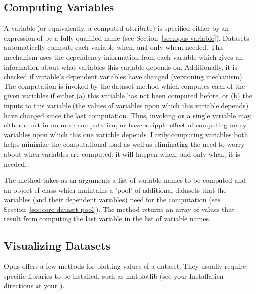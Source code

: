 %
\subsection{Computing Variables}
%
A variable (or equivalently, a computed attribute) is specified either by an expression of by a 
fully-qualified name (see Section~\ref{sec:opus-variable}).
Datasets \datasetindex automatically compute each variable \variablesindex when, and only when,
needed.   This mechanism uses the dependency information
from each variable \variablesindex which gives an information about what variables \variablesindex this
variable \variablesindex depends on. Additionally, it is checked if variable's \variablesindex dependent
variables \variablesindex have changed (versioning mechanism).  The computation is invoked by
the dataset \datasetindex method  which computes each of the
given variables \variablesindex if either (a) this variable \variablesindex has not been computed before, or
(b) the inputs to this variable \variablesindex (the values of variables \variablesindex upon which this
variable \variablesindex depends) have changed since the last computation.  Thus, invoking
 \variablesindex on a single variable \variablesindex may either result in no more
computation, or have a ripple effect of computing many variables \variablesindex upon which
this one variable \variablesindex depends.  Lazily computing variables \variablesindex both helps minimize the
computational load as well as eliminating the need to worry about when
variables \variablesindex are computed: it will happen when, and only when, it is needed.

The method  \variablesindex takes as an arguments a list of
variable \variablesindex names to be computed and an object of class  which
maintains a 'pool' of additional datasets that the variables \variablesindex (and their dependent
variables) \variablesindex need for the computation (see Section~\ref{sec:core-dataset-pool}). 
The method returns an array of values that result from computing the last variable in the 
list of variable names.

\subsection{Visualizing Datasets}
%
Opus offers a few methods for plotting values of a dataset. \datasetindex They usually
require specific libraries to be installed, such as matplotlib (see your
Installation directions at your ).

